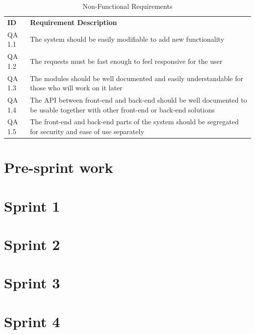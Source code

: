\documentclass[11pt,a4paper,titlepage,oneside]{report}
\begin{document}
  \begin{longtable}{p{1.4cm} p{9.8cm} }
  \caption[Non-Functional Requirements]{Non-Functional Requirements} \label{nonFuncReqs} \\
  \hline
  \multicolumn{1}{p{1.4cm}}{\textbf{ID}} &
  \multicolumn{1}{p{9.8cm}}{\textbf{Requirement Description}}
  \endfirsthead

  \multicolumn{2}{r}{{Continued on next page}} \\
  \endfoot

  \hline \hline
  \endlastfoot

  \hline
  QA 1.1 & The system should be easily modifiable to add new functionality\\ \hline

  QA 1.2 & The requests must be fast enough to feel responsive for the user \\ \hline

  QA 1.3 & The modules should be well documented and easily understandable for those who will work on it later \\ \hline

  QA 1.4 & The API between front-end and back-end should be well documented to be usable together with other front-end or back-end solutions \\ \hline

  QA 1.5 & The front-end and back-end parts of the system should be segregated for security and ease of use separately \\ \hline

  \end{longtable}

\chapter {Pre-sprint work}

\chapter{Sprint 1}

\chapter{Sprint 2}

\chapter{Sprint 3}

\chapter{Sprint 4}
\end{document}
